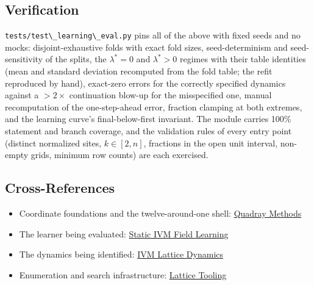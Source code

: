 \documentclass[
  10pt,
]{article}
\newcommand{\passthrough}[1]{#1}
\providecommand{\tightlist}{%
  \setlength{\itemsep}{0pt}\setlength{\parskip}{0pt}}
\begin{document}
\subsection{Verification}\label{verification}

\passthrough{\lstinline!tests/test\_learning\_eval.py!} pins all of the
above with fixed seeds and no mocks: disjoint-exhaustive folds with
exact fold sizes, seed-determinism and seed-sensitivity of the splits,
the \(\lambda^{*}=0\) and \(\lambda^{*}>0\) regimes with their table
identities (mean and standard deviation recomputed from the fold table;
the refit reproduced by hand), exact-zero errors for the correctly
specified dynamics against a \(> 2\times\) continuation blow-up for the
misspecified one, manual recomputation of the one-step-ahead error,
fraction clamping at both extremes, and the learning curve's
final-below-first invariant. The module carries 100\% statement and
branch coverage, and the validation rules of every entry point (distinct
normalized sites, \(k \in
[2, n]\), fractions in the open unit interval, non-empty grids, minimum
row counts) are each exercised.

\subsection{Cross-References}\label{cross-references}

\begin{itemize}
\tightlist
\item
  Coordinate foundations and the twelve-around-one shell:
  \href{03_quadray_methods.md}{Quadray Methods}
\item
  The learner being evaluated: \href{11_ivm_field_learning.md}{Static
  IVM Field Learning}
\item
  The dynamics being identified: \href{12_ivm_dynamics.md}{IVM Lattice
  Dynamics}
\item
  Enumeration and search infrastructure:
  \href{13_lattice_tooling.md}{Lattice Tooling}
\end{itemize}
\end{document}

